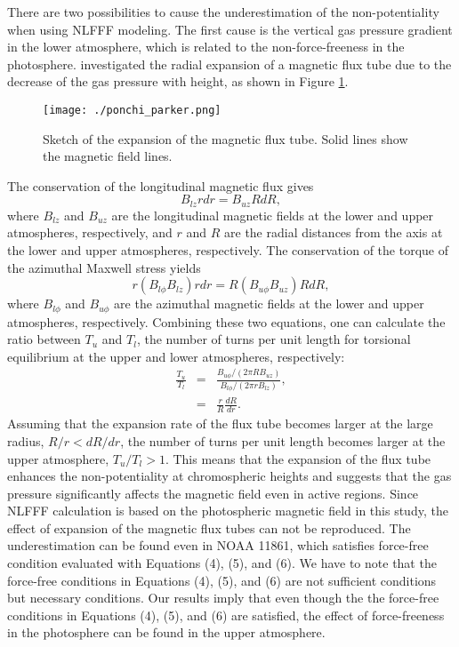 \documentclass[manuscript]{aastex61}
\begin{document}
There are two possibilities to cause the underestimation of the
non-potentiality when using NLFFF modeling. The first cause is the vertical gas
pressure gradient in the lower atmosphere, which is related to the non-force-freeness in the photosphere. \cite{1974ApJ...191..245P}
investigated the radial expansion of a magnetic flux tube due to the decrease of
the gas pressure with height, as shown in Figure \ref{ponchi_parker}.
\begin{figure}
\texttt{[image: ./ponchi\_parker.png]}
\caption{Sketch of the expansion of the magnetic flux tube. Solid lines show the magnetic field lines. }
\label{ponchi_parker}
\end{figure}
The conservation of the longitudinal magnetic flux gives
\begin{equation}
B_{lz}rdr=B_{uz}RdR,
\end{equation}
where $B_{lz}$ and $B_{uz}$ are the longitudinal magnetic fields at the lower
and upper atmospheres, respectively, and $r$ and $R$ are the radial distances
from the axis at the lower and upper atmospheres, respectively. The conservation
of the torque of the azimuthal Maxwell stress yields
\begin{equation}
r(B_{l\phi}B_{lz})rdr=R(B_{u\phi}B_{uz})RdR,
\end{equation}
where $B_{l\phi}$ and $B_{u\phi}$ are the azimuthal magnetic fields at the lower
and upper atmospheres, respectively. Combining these two equations, one can calculate
the ratio between $T_{u}$ and $T_{l}$, the number of turns per unit length for torsional
equilibrium at the upper and lower atmospheres, respectively:
\begin{eqnarray}
\frac{T_{u}}{T_{l}}&=&\frac{B_{u\phi}/(2\pi RB_{uz})}{B_{l\phi}/(2\pi r
B_{lz})}, \nonumber \\
&=&\frac{r}{R}\frac{dR}{dr}.
\end{eqnarray}
Assuming that the expansion rate of the flux tube becomes larger at the large radius,
$R/r<dR/dr$, the number of turns per unit length becomes larger at the upper
atmosphere, $T_u/T_l>1$. This means that the expansion of the flux tube
enhances the non-potentiality at chromospheric heights and suggests that
the gas pressure significantly affects the magnetic field even in active
regions. Since NLFFF calculation is based on the photospheric magnetic field in
this study, the effect of expansion of the magnetic flux tubes can not be
reproduced. 
 The underestimation can be found even in NOAA 11861, which satisfies force-free condition evaluated with Equations (4), (5), and (6).
We have to note that the force-free conditions in Equations (4), (5), and (6) are not sufficient conditions but necessary conditions.
Our results imply that even though the the force-free conditions in Equations (4), (5), and (6) are satisfied, the effect of force-freeness in the photosphere can be found in the upper atmosphere.
\end{document}
